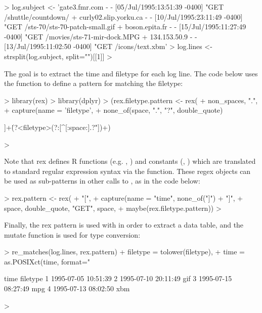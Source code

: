 \begin{Schunk}
\begin{Sinput}
> log.subject <- 'gate3.fmr.com - - [05/Jul/1995:13:51:39 -0400] "GET /shuttle/countdown/ 
+ curly02.slip.yorku.ca - - [10/Jul/1995:23:11:49 -0400] "GET /sts-70/sts-70-patch-small.gif
+ boson.epita.fr - - [15/Jul/1995:11:27:49 -0400] "GET /movies/sts-71-mir-dock.MPG
+ 134.153.50.9 - - [13/Jul/1995:11:02:50 -0400] "GET /icons/text.xbm'
> log.lines <- strsplit(log.subject, split="\n")[[1]]
> 
\end{Sinput}
\end{Schunk}

The goal is to extract the time and filetype for
each log line. The code below uses the  function to define a
pattern for matching the filetype: 

\begin{Schunk}
\begin{Sinput}
> library(rex)
> library(dplyr)
> (rex.filetype.pattern <- rex(
+   non_spaces, ".",
+   capture(name = 'filetype',
+           none_of(space, ".", "?", double_quote) %>% one_or_more())))
\end{Sinput}
\begin{Soutput}
[^[:space:]]+\.(?<filetype>(?:[^[:space:].?"])+)
\end{Soutput}
\begin{Sinput}
> 
\end{Sinput}
\end{Schunk}

Note that rex defines R functions (e.g. ,
) and constants (,
) which are translated to standard regular expression
syntax via the  function. These regex objects can be used as
sub-patterns in other calls to , as in the code below:

\begin{Schunk}
\begin{Sinput}
> rex.pattern <- rex(
+   "[",
+   capture(name = "time", none_of("]") %>% zero_or_more()),
+   "]",
+   space, double_quote, "GET", space,
+   maybe(rex.filetype.pattern))
> 
\end{Sinput}
\end{Schunk}

Finally, the rex pattern is used with  in order to
extract a data table, and the mutate function is used for type
conversion:

\begin{Schunk}
\begin{Sinput}
> re_matches(log.lines, rex.pattern) %>% mutate(
+   filetype = tolower(filetype),
+   time = as.POSIXct(time, format="%d/%b/%Y:%H:%M:%S %z"))
\end{Sinput}
\begin{Soutput}
                 time filetype
1 1995-07-05 10:51:39         
2 1995-07-10 20:11:49      gif
3 1995-07-15 08:27:49      mpg
4 1995-07-13 08:02:50      xbm
\end{Soutput}
\begin{Sinput}
> 
\end{Sinput}
\end{Schunk}


